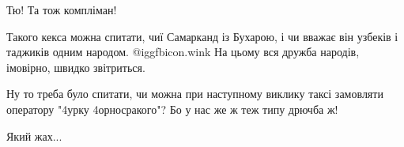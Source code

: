 \begin{itemize}
Тю! Та тож компліман!

 

Такого кекса можна спитати, чиї Самарканд із Бухарою, і чи вважає він узбеків і
таджиків одним народом.  @igg{fbicon.wink}  На цьому вся дружба народів, імовірно, швидко
звітриться.


 

Ну то треба було спитати, чи можна при наступному виклику таксі замовляти
оператору "4урку 4орносракого"? Бо у нас же ж теж типу дрючба ж!


 
Який жах...


\end{itemize}

